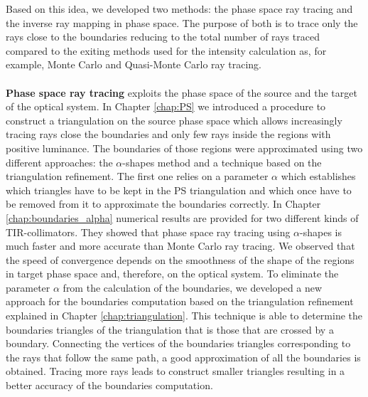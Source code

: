 Based on this idea, we developed two methods: the phase space ray tracing and the inverse ray mapping in phase space. The purpose of both is to trace only the rays close to the boundaries reducing to the total number of rays traced compared to the exiting methods used for the intensity calculation as, for example, Monte Carlo and Quasi-Monte Carlo ray tracing.
\\ \\ \indent \textbf{Phase space ray tracing} exploits the phase space of the source and the target of the optical system. In Chapter \ref{chap:PS} we introduced a procedure to construct a triangulation on the source phase space which allows increasingly tracing rays close the boundaries and only few rays inside the regions with positive luminance. 
The boundaries of those regions were approximated using two different approaches: the $\alpha$-shapes method and a technique based on the triangulation refinement. The first one relies on a parameter $\alpha$ which establishes which triangles have to be kept in the PS triangulation and which once have to be removed from it to approximate the boundaries correctly. 
In Chapter \ref{chap:boundaries_alpha} numerical results are provided for two different kinds of TIR-collimators. They showed that phase space ray tracing using $\alpha$-shapes is much faster and more accurate than Monte Carlo ray tracing. We observed that the speed of convergence depends on the smoothness of the shape of the regions in target phase space and, therefore, on the optical system. To eliminate the parameter $\alpha$ from the calculation of the boundaries, we developed a new approach for the boundaries computation based on the triangulation refinement explained in Chapter \ref{chap:triangulation}. This technique is able to determine the boundaries triangles of the triangulation that is those that are crossed by a boundary. Connecting the vertices of the boundaries triangles corresponding to the rays that follow the same path, a good approximation of all the boundaries is obtained. Tracing more rays leads to construct smaller triangles resulting in a better accuracy of the boundaries computation. 
